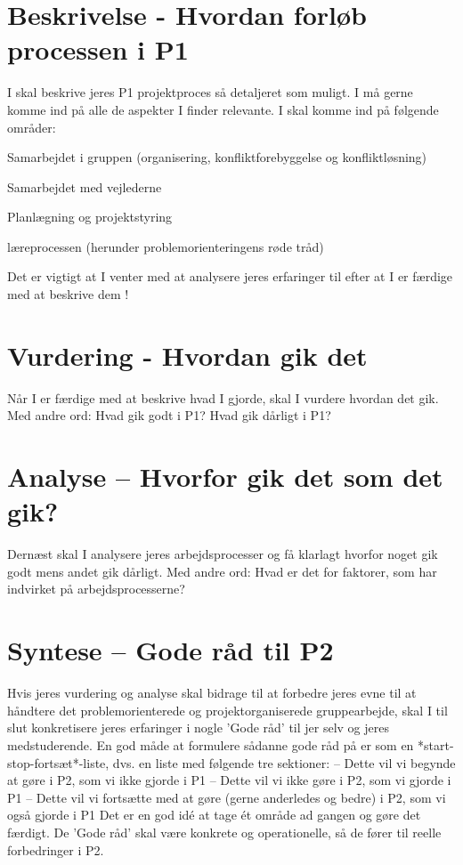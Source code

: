 \documentclass[oneside,a4paper,titlepage]{article}
\begin{document}
\section{Beskrivelse - Hvordan forløb processen i P1}
I skal beskrive jeres P1 projektproces så detaljeret som muligt. I må gerne komme ind på alle de
aspekter I finder relevante. I skal komme ind på følgende områder:

Samarbejdet i gruppen (organisering, konfliktforebyggelse og konfliktløsning)

Samarbejdet med vejlederne

Planlægning og projektstyring

læreprocessen (herunder problemorienteringens røde tråd)



Det er vigtigt at I venter med at analysere jeres erfaringer til efter at I er færdige med at beskrive
dem ! 


\section{Vurdering - Hvordan gik det}
Når I er færdige med at beskrive hvad I gjorde, skal I vurdere hvordan det gik. Med andre ord:
Hvad gik godt i P1? Hvad gik dårligt i P1? 

\section{Analyse – Hvorfor gik det som det gik?}
Dernæst skal I analysere jeres arbejdsprocesser og få klarlagt hvorfor noget gik godt mens andet gik dårligt. Med andre ord: Hvad er det for faktorer, som har indvirket på arbejdsprocesserne? 

\section{Syntese – Gode råd til P2}
Hvis jeres vurdering og analyse skal bidrage til at forbedre jeres evne til at håndtere det
problemorienterede og projektorganiserede gruppearbejde, skal I til slut konkretisere jeres erfaringer i nogle ’Gode råd’ til jer selv og jeres medstuderende. En god måde at formulere sådanne gode råd på er som en *start-stop-fortsæt*-liste, dvs. en liste med følgende tre sektioner:
– Dette vil vi begynde at gøre i P2, som vi ikke gjorde i P1 
– Dette vil vi ikke gøre i P2, som vi gjorde i P1
– Dette vil vi fortsætte med at gøre (gerne anderledes og bedre) i P2, som vi også gjorde i P1
Det er en god idé at tage ét område ad gangen og gøre det færdigt. De ’Gode råd’ skal være
konkrete og operationelle, så de fører til reelle forbedringer i P2. 
\end{document}
